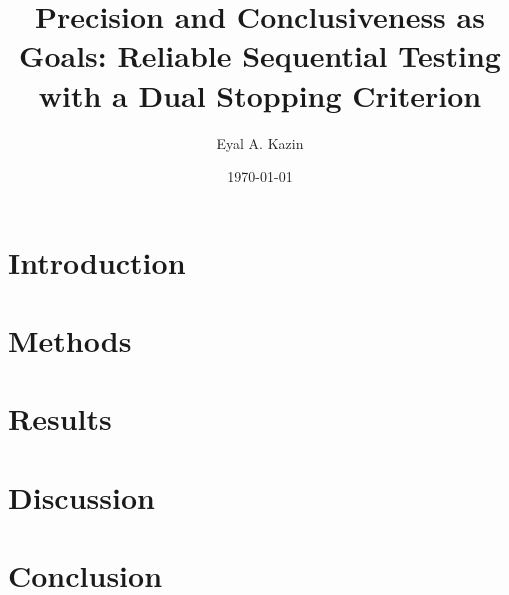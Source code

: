 \documentclass{article}
\title{Precision and Conclusiveness as Goals: Reliable Sequential Testing with a Dual Stopping Criterion}
\date{\today}
\author{Eyal A. Kazin}
\begin{document}
\maketitle



%

\section{Introduction}




\section{Methods}\label{sec:methods}



\section{Results}\label{sec:results}



\section{Discussion}\label{sec:discussion}


\section{Conclusion}\label{sec:conclusion}


\appendix











%

%



\end{document}
